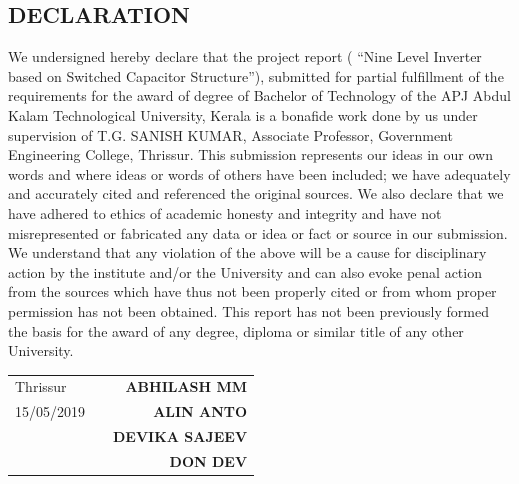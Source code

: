 \documentclass[12pt,a4paper]{report}
\begin{document}
\begin{center}
	\section*{DECLARATION}
\end{center}


	We undersigned hereby declare that the project report ( “Nine Level Inverter based on Switched Capacitor Structure”), submitted for partial fulfillment of the requirements for the award of degree of Bachelor of Technology of the APJ Abdul Kalam Technological University, Kerala is a bonafide work done by us under supervision of T.G. SANISH KUMAR, Associate Professor, Government Engineering College, Thrissur. This submission represents our ideas in our own words and where ideas or words of others have been included; we have adequately and accurately cited and referenced the original sources. We also declare that we have adhered to ethics of academic honesty and integrity and have not misrepresented or fabricated any data or idea or fact or source in our submission. We understand that any violation of the above will be a cause for disciplinary action by the institute and/or the University and can also evoke penal action from the sources which have thus not been properly cited or from whom proper permission has not been obtained. This report has not been previously formed the basis for the award of any degree, diploma or similar title of any other University. \\
	
	\begin{tabular}{lp{1.5in}r}
		Thrissur          &&  \textbf{ABHILASH MM}\\
		15/05/2019 &&  \textbf{ALIN ANTO}\\
						  &&  \textbf{DEVIKA SAJEEV}\\
						  &&  \textbf{DON DEV}\\
	\end{tabular}
	\thispagestyle{empty} 
	\clearpage
	
\end{document}
